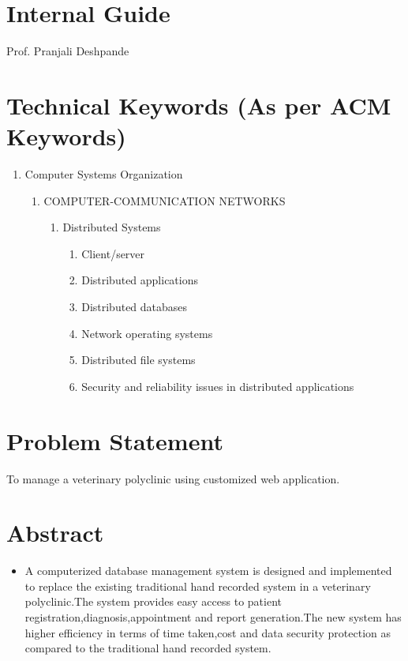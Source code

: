 \documentclass[oneside,a4paper,12pt]{book}
\begin{document}
\section{Internal Guide}
Prof. Pranjali Deshpande

\section{Technical Keywords (As per ACM Keywords)}

\begin{enumerate}
	\item  Computer Systems Organization 
	\begin{enumerate}
		\item  COMPUTER-COMMUNICATION NETWORKS 
		\begin{enumerate}
			\item  Distributed Systems 
			\begin{enumerate}
				\item  Client/server 
\item Distributed applications
\item Distributed databases
\item Network operating systems 
\item Distributed file systems
\item Security and reliability issues in distributed applications
	 		\end{enumerate} 
		\end{enumerate} 
	  

	
	\end{enumerate}
\end{enumerate}



\section{Problem Statement}
\label{sec:problem}
       To manage a veterinary polyclinic using customized web application.
\section{Abstract}
\begin{itemize}
	\item A computerized database management system is designed and implemented to replace the existing traditional hand recorded system in a veterinary polyclinic.The system provides easy access to patient registration,diagnosis,appointment and report generation.The new system has higher efficiency in terms of time taken,cost and data security protection as compared to the traditional hand recorded system.
\end{itemize}
\end{document}

